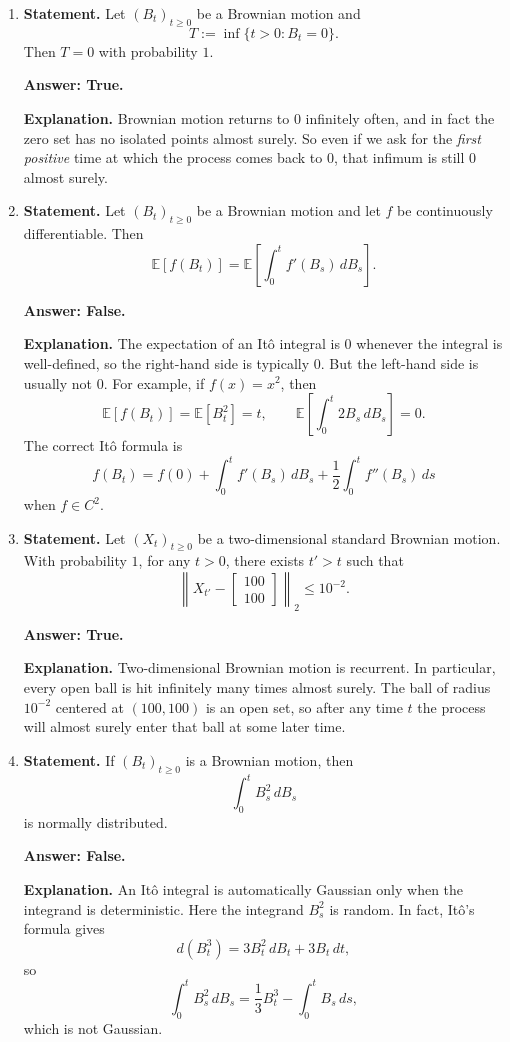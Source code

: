 \documentclass[11pt]{article}
\theoremstyle{definition}
\begin{document}
\begin{enumerate}[label=(\arabic*)]
    \item \textbf{Statement.} Let \((B_t)_{t\ge 0}\) be a Brownian motion and
    \[
    T:=\inf\{t>0:B_t=0\}.
    \]
    Then \(T=0\) with probability \(1\).

    \textbf{Answer: True.}

    \textbf{Explanation.} Brownian motion returns to \(0\) infinitely often, and in fact the zero set has no isolated points almost surely. So even if we ask for the \emph{first positive} time at which the process comes back to \(0\), that infimum is still \(0\) almost surely.

    \item \textbf{Statement.} Let \((B_t)_{t\ge 0}\) be a Brownian motion and let \(f\) be continuously differentiable. Then
    \[
    \mathbb E[f(B_t)] = \mathbb E\!\left[\int_0^t f'(B_s)\,dB_s\right].
    \]

    \textbf{Answer: False.}

    \textbf{Explanation.} The expectation of an It\^o integral is \(0\) whenever the integral is well-defined, so the right-hand side is typically \(0\). But the left-hand side is usually not \(0\). For example, if \(f(x)=x^2\), then
    \[
    \mathbb E[f(B_t)] = \mathbb E[B_t^2]=t,
    \qquad
    \mathbb E\!\left[\int_0^t 2B_s\,dB_s\right]=0.
    \]
    The correct It\^o formula is
    \[
    f(B_t)=f(0)+\int_0^t f'(B_s)\,dB_s + \frac12\int_0^t f''(B_s)\,ds
    \]
    when \(f\in C^2\).

    \item \textbf{Statement.} Let \((X_t)_{t\ge 0}\) be a two-dimensional standard Brownian motion. With probability \(1\), for any \(t>0\), there exists \(t'>t\) such that
    \[
    \left\|X_{t'}-\begin{bmatrix}100\\100\end{bmatrix}\right\|_2\le 10^{-2}.
    \]

    \textbf{Answer: True.}

    \textbf{Explanation.} Two-dimensional Brownian motion is recurrent. In particular, every open ball is hit infinitely many times almost surely. The ball of radius \(10^{-2}\) centered at \((100,100)\) is an open set, so after any time \(t\) the process will almost surely enter that ball at some later time.

    \item \textbf{Statement.} If \((B_t)_{t\ge 0}\) is a Brownian motion, then
    \[
    \int_0^t B_s^2\,dB_s
    \]
    is normally distributed.

    \textbf{Answer: False.}

    \textbf{Explanation.} An It\^o integral is automatically Gaussian only when the integrand is deterministic. Here the integrand \(B_s^2\) is random. In fact, It\^o's formula gives
    \[
    d(B_t^3)=3B_t^2\,dB_t+3B_t\,dt,
    \]
    so
    \[
    \int_0^t B_s^2\,dB_s
    =
    \frac13 B_t^3 - \int_0^t B_s\,ds,
    \]
    which is not Gaussian.
\end{enumerate}
\end{document}
